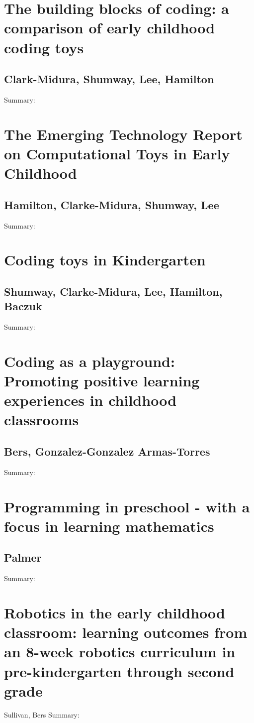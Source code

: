 \documentclass[12pt]{extarticle}
\begin{document}
{\section*{The building blocks of coding: a comparison of early childhood coding toys}
\subsection*{Clark-Midura, Shumway, Lee, Hamilton}
Summary:	

\section*{The Emerging Technology Report on Computational Toys in Early Childhood}
\subsection*{Hamilton, Clarke-Midura, Shumway, Lee}
Summary:	


\section*{Coding toys in Kindergarten}
\subsection*{Shumway, Clarke-Midura, Lee, Hamilton, Baczuk}
Summary:	


\section*{Coding as a playground: Promoting positive learning experiences in childhood classrooms}
\subsection*{Bers, Gonzalez-Gonzalez Armas-Torres}
Summary:	


\section*{Programming in preschool - with a focus in learning mathematics}
\subsection*{Palmer}
Summary:	


\section*{Robotics in the early childhood classroom: learning outcomes from an 8-week robotics curriculum in pre-kindergarten through second grade}
Sullivan, Bers
Summary:	


}
\end{document}
